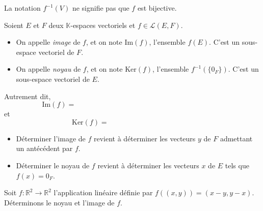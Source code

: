 \documentclass[a4paper,10pt]{report}
\begin{document}
 \begin{att} La notation $f^{-1}(V)$ ne signifie pas que $f$ est bijective.
 \end{att}
 
 \begin{TheoremeDefinition}{} Soient $E$ et $F$ deux $\mathbb{K}$-espaces vectoriels et $f \in \mathcal{L}(E,F)$.
\begin{itemize}
 \item On appelle \emph{image} de $f$, et on note $\textrm{Im}(f)$, l'ensemble $f(E)$. C'est un sous-espace vectoriel de $F$.
 \item On appelle \emph{noyau} de $f$, et on note $\textrm{Ker}(f)$, l'ensemble $f^{-1}(\lbrace 0_F \rbrace)$. C'est un sous-espace vectoriel de $E$.
 \end{itemize}
 \end{TheoremeDefinition}
 
 Autrement dit,
$$ \textrm{Im}(f)= \phantom{\lbrace f(x) \, \vert \, x \in E \rbrace = \lbrace y \in F \, \vert \, \exists x \in E, \, y=f(x) \rbrace}$$
et
$$ \textrm{Ker}(f) = \phantom{ bla bl a\lbrace x \in E \, \vert \,  f(x)= 0_F \rbrace}$$

\medskip

 \begin{Remarques}{}
\begin{itemize} 
 \item Déterminer l'image de $f$ revient à déterminer les vecteurs $y$ de $F$ admettant un antécédent par $f$.
 \item Déterminer le noyau de $f$ revient à déterminer les vecteurs $x$ de $E$ tels que $f(x)= 0_F$.
 \end{itemize}
\end{Remarques}{}
 
 \newpage
 
 \begin{Exemple} Soit $f : \mathbb{R}^2 \rightarrow \mathbb{R}^2$ l'application linéaire définie par $f((x,y))=(x-y,y-x)$. Déterminons le noyau et l'image de $f$.
 
% 

\vspace{7cm}
\end{Exemple}
\end{document}
